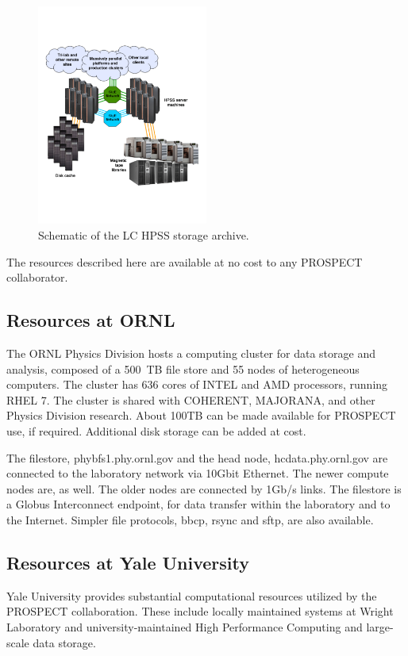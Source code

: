 \begin{figure}
\includegraphics[width=0.50\textwidth]{figures/hpssDiagram.pdf}
\caption{Schematic of the LC HPSS storage archive.} \label{fig:HPSS}
\end{figure}

The resources described here are available at no cost to any PROSPECT collaborator.  


\subsection{Resources at ORNL}
The ORNL Physics Division hosts a computing cluster for data storage and analysis, composed of a 500~TB file store and 55 nodes of heterogeneous computers.  The cluster has 636 cores of INTEL and AMD processors, running RHEL 7.  The cluster is shared with COHERENT, MAJORANA, and other Physics Division research.  About 100TB can be made available for PROSPECT use, if required.  Additional disk storage can be added at cost.

The filestore, phybfs1.phy.ornl.gov and the head node, hcdata.phy.ornl.gov are connected to the laboratory network via 10Gbit Ethernet.  The newer compute nodes are, as well.  The older nodes are connected by 1Gb/s links.  The filestore is a Globus Interconnect endpoint, for data transfer within the laboratory and to the Internet.  Simpler file protocols, bbcp, rsync and sftp, are also available. 

\subsection{Resources at Yale University}
Yale University provides substantial computational resources utilized by the PROSPECT collaboration.
These include locally maintained systems at Wright Laboratory and university-maintained High Performance Computing and large-scale data storage.

